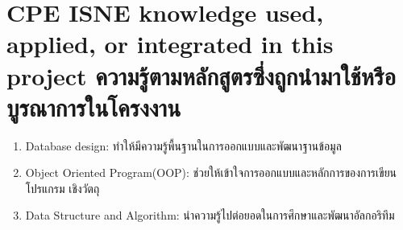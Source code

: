 




\section{\ifenglish%
\ifcpe CPE \else ISNE \fi knowledge used, applied, or integrated in this project
\else%
ความรู้ตามหลักสูตรซึ่งถูกนำมาใช้หรือบูรณาการในโครงงาน
\fi
}
\begin{enumerate}
  \item Database design: ทำให้มีความรู้พื้นฐานในการออกแบบและพัฒนาฐานข้อมูล
  \item Object Oriented Program(OOP): ช่วยให้เข้าใจการออกแบบและหลักการของการเขียนโปรแกรม
  เชิงวัตถุ
  \item Data Structure and Algorithm: นำความรู้ไปต่อยอดในการศึกษาและพัฒนาอัลกอริทึม
\end{enumerate}




